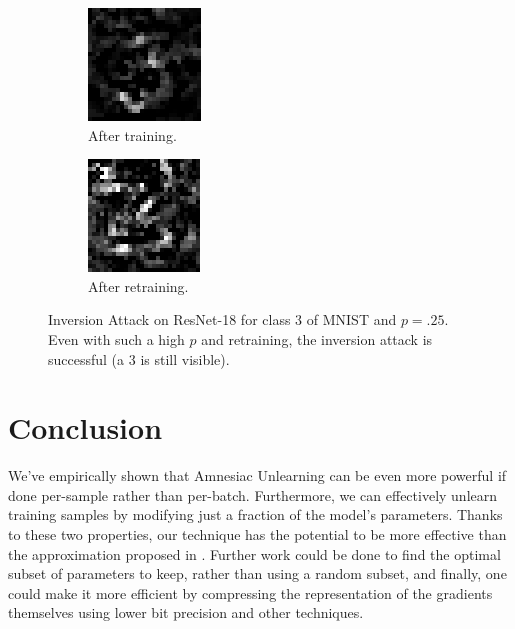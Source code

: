 \documentclass{article}
\begin{document}
\begin{figure}
    \centering
    \begin{subfigure}[b]{0.23\textwidth}
        \centering
        \includegraphics[width=.48\textwidth]{trained_single.png}
        \caption{After training.}
    \end{subfigure}%
    \begin{subfigure}[b]{0.23\textwidth}
        \centering
        \includegraphics[width=.48\textwidth]{retrained_single.png}
        \caption{After retraining.}
    \end{subfigure}
    \caption{Inversion Attack on ResNet-18 for class $3$ of MNIST and $p=.25$. Even with such a high $p$ and retraining, the inversion attack is successful (a $3$ is still visible).}
    \label{fig:inversion}
\end{figure}

\section{Conclusion}
We've empirically shown that Amnesiac Unlearning can be even more powerful if done per-sample rather than per-batch. Furthermore, we can effectively unlearn training samples by modifying just a fraction of the model's parameters. Thanks to these two properties, our technique has the potential to be more effective than the approximation proposed in \cite{gogineni2024efficient}. Further work could be done to find the optimal subset of parameters to keep, rather than using a random subset, and finally, one could make it more efficient by compressing the representation of the gradients themselves using lower bit precision and other techniques.



\end{document}
